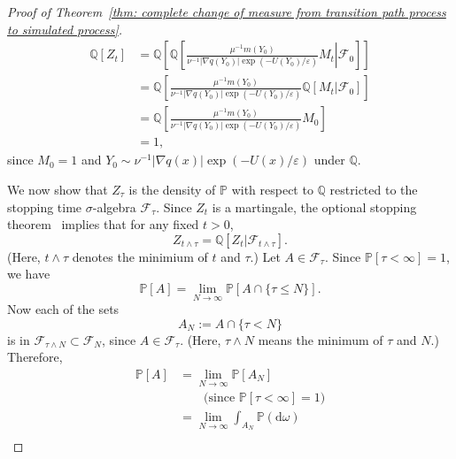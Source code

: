 \documentclass[reqno]{amsart}
\newcommand{\eps}{\varepsilon}
\newcommand{\1}{\mathds{1}}
\renewcommand{\d}{\mathrm{d}}
\newcommand{\grad}{\nabla}
\renewcommand{\P}{\mathds{P}}
\newcommand{\Q}{\mathds{Q}}
\newcommand{\F}{\mathcal{F}}
\theoremstyle{definition}
\theoremstyle{remark}
\begin{document}
\begin{proof}[Proof of Theorem~\ref{thm: complete change of measure from transition path process to simulated process}]
  \begin{align*}
    \Q[Z_t]&= \Q \left [ \Q \left [ \left .  \frac{\mu^{-1} m(Y_0)}{\nu^{-1} \lvert \grad q(Y_0) \rvert \exp(-U(Y_0) /\eps)} M_t \right \vert \F_0 \right ] \right ] \\
           &= \Q \left [ \frac{\mu^{-1} m(Y_0)}{\nu^{-1} \lvert \grad q(Y_0) \rvert \exp(-U(Y_0) /\eps)} \Q[M_t \vert \F_0] \right ] \\
           &= \Q \left [\frac{\mu^{-1} m(Y_0)}{\nu^{-1} \lvert \grad q(Y_0) \rvert \exp(-U(Y_0) /\eps)} M_0 \right ] \\
          &=1,
  \end{align*}
  since $M_0=1$ and $Y_0 \sim \nu^{-1} \lvert \grad q(x) \rvert \exp(-U(x)/\eps)$ under $\Q$. 
  
  
  We now show that $Z_\tau$ is the density of $\P$ with respect to $\Q$ restricted to the stopping time $\sigma$-algebra $\F_\tau$. Since $Z_t$ is a martingale, the optional stopping theorem~\cite[Chapter~2, Theorem~3.2]{revuz_continuous_1999} implies that for any fixed $t >0$,
  \begin{equation*}
    Z_{t \wedge \tau} = \Q[Z_t \vert \F_{t \wedge \tau}].
  \end{equation*}
  (Here, $t \wedge \tau$ denotes the minimium of $t$ and $\tau$.) 
  Let $A \in \F_\tau$. Since $\P[\tau < \infty]=1$, we have
  \begin{equation*}
    \P[A]=\lim_{N \rightarrow \infty} \P [A \cap \{\tau \leq N\}].
  \end{equation*}
  Now each of the sets
 \begin{equation*}
    A_N:=A\cap \{ \tau < N\} 
  \end{equation*}
  is in $\F_{\tau \wedge N} \subset \F_N$, since $A \in \F_\tau$. (Here, $\tau \wedge N$ means the minimum of $\tau$ and $N$.)
  Therefore,
  \begin{align*}
    \P[A] &= \lim_{N \rightarrow \infty} \P[A_N]\\
          &\qquad \text{(since $\P[\tau < \infty ]=1$)}\\
          &= \lim_{N \rightarrow \infty}  \int_{A_N} \P (\d \omega) \\

\end{align*}
\end{proof}
\end{document}
